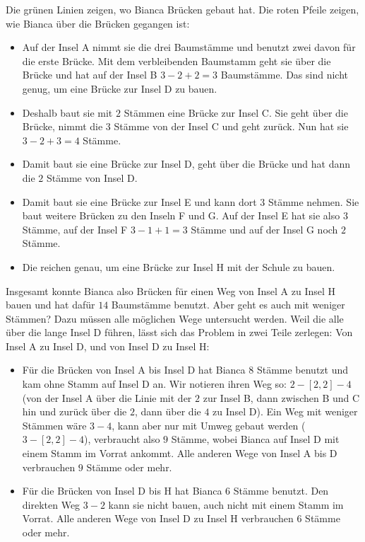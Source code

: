 {{{\centering%
\par}

Die grünen Linien zeigen, wo Bianca Brücken gebaut hat.  Die roten Pfeile zeigen, wie Bianca über die Brücken gegangen ist:

\begin{itemize}
  \item Auf der Insel A nimmt sie die drei Baumstämme und benutzt zwei davon für die erste Brücke. Mit dem verbleibenden Baumstamm geht sie über die Brücke und hat auf der Insel B ${3 - 2 + 2 = 3}$ Baumstämme.  Das sind nicht genug, um eine Brücke zur Insel D zu bauen.
  \item Deshalb baut sie mit $2$ Stämmen eine Brücke zur Insel C.  Sie geht über die Brücke, nimmt die $3$ Stämme von der Insel C und geht zurück.  Nun hat sie ${3 - 2 + 3 = 4}$ Stämme.
  \item Damit baut sie eine Brücke zur Insel D, geht über die Brücke und hat dann die $2$ Stämme von Insel D.
  \item Damit baut sie eine Brücke zur Insel E und kann dort $3$ Stämme nehmen.  Sie baut weitere Brücken zu den Inseln F und G.  Auf der Insel E hat sie also $3$ Stämme, auf der Insel F ${3 - 1 + 1 = 3}$ Stämme und auf der Insel G noch $2$ Stämme.
  \item Die reichen genau, um eine Brücke zur Insel H mit der Schule zu bauen.
\end{itemize}

Insgesamt konnte Bianca also Brücken für einen Weg von Insel A zu Insel H bauen und hat dafür $14$ Baumstämme benutzt.  Aber geht es auch mit weniger Stämmen?  Dazu müssen alle möglichen Wege untersucht werden.  Weil die alle über die lange Insel D führen, lässt sich das Problem in zwei Teile zerlegen: Von Insel A zu Insel D, und von Insel D zu Insel H:

\begin{itemize}
  \item Für die Brücken von Insel A bis Insel D hat Bianca $8$ Stämme benutzt und kam ohne Stamm auf Insel D an.  Wir notieren ihren Weg so: ${2-[2,2]-4}$ (von der Insel A über die Linie mit der $2$ zur Insel B, dann zwischen B und C hin und zurück über die $2$, dann über die $4$ zu Insel D).  Ein Weg mit weniger Stämmen wäre ${3-4}$, kann aber nur mit Umweg gebaut werden (${3-[2,2]-4}$), verbraucht also $9$ Stämme, wobei Bianca auf Insel D mit einem Stamm im Vorrat ankommt.  Alle anderen Wege von Insel A bis D verbrauchen $9$ Stämme oder mehr.
  \item Für die Brücken von Insel D bis H hat Bianca $6$ Stämme benutzt. Den direkten Weg ${3-2}$ kann sie nicht bauen, auch nicht mit einem Stamm im Vorrat. Alle anderen Wege von Insel D zu Insel H verbrauchen $6$ Stämme oder mehr.
\end{itemize}

}}
